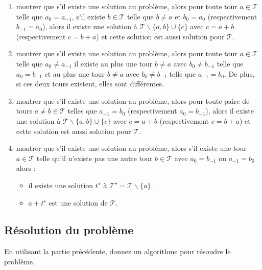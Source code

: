 \documentclass
[12pt]
{article}
\begin{document}
\begin{enumerate}
    \item montrer que s'il existe une solution au problème, alors pour toute tour $a \in \mathcal{T}$ telle que $a_0 = a_{-1}$, s'il existe $b \in \mathcal{T}$ telle que $b \neq a$ et $b_0 = a_0$  (respectivement $b_{-1} = a_0$), alors il existe une solution à $\mathcal{T} \backslash \{a, b\} \cup \{ c \}$ avec $c = a + b$ (respectivement $c=b+a$) et cette solution est aussi solution pour $\mathcal{T}$.
    \item montrer que s'il existe une solution au problème, alors pour toute tour $a \in \mathcal{T}$ telle que $a_0 \neq a_{-1}$ il existe au plus une tour $b \neq a$ avec $b_0 \neq b_{-1}$ telle que $a_0 = b_{-1}$ et au plus une tour $b \neq a$ avec $b_0 \neq b_{-1}$ telle que $a_{-1} = b_0$. De plus, si ces deux tours existent, elles sont différentes.
    \item montrer que s'il existe une solution au problème, alors pour toute paire de tours $a \neq b \in \mathcal{T}$ telles que $a_{-1} = b_0$ (respectivement $a_0 = b_{-1}$), alors il existe une solution à $\mathcal{T} \backslash \{a, b\} \cup \{ c \}$ avec $c = a + b$ (respectivement $c=b+a$)  et cette solution est aussi solution pour $\mathcal{T}$.
    \item montrer que s'il existe une solution au problème, alors s'il existe une tour $a \in \mathcal{T}$ telle qu'il n'existe pas une autre tour $b \in \mathcal{T}$ avec $a_0 = b_{-1}$ ou $a_{-1} = b_0$ alors :
    \begin{itemize}
        \item il existe une solution $t^\star$ à $\mathcal{T}^\star = \mathcal{T} \backslash \{ a \}$.
        \item $a + t^\star$ est une solution de $\mathcal{T}$.
    \end{itemize}
    \end{enumerate}

\subsection{Résolution du problème}

En utilisant la partie précédente, donnez un algorithme pour résoudre le problème.
\end{document}
